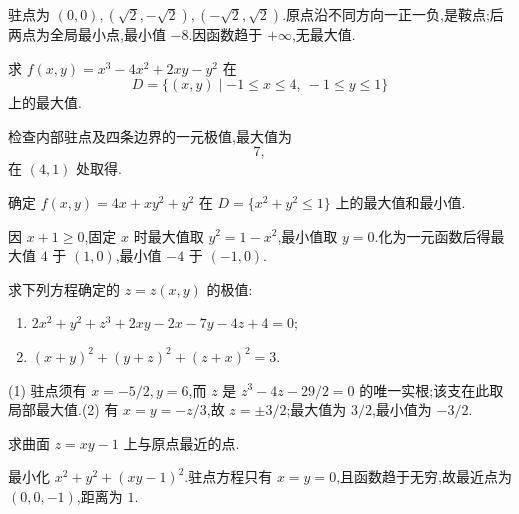 \begin{solution}
    驻点为 $(0,0),(\sqrt{2},-\sqrt{2}),(-\sqrt{2},\sqrt{2})$.原点沿不同方向一正一负,是鞍点;后两点为全局最小点,最小值 $-8$.因函数趋于 $+\infty$,无最大值.
\end{solution}

\begin{example}
    求 $f(x,y)=x^3-4x^2+2xy-y^2$ 在
    \[
        D=\{(x,y)\mid -1\leq x\leq4,\ -1\leq y\leq1\}
    \]
    上的最大值.
\end{example}
\exampleblank

\begin{solution}
    检查内部驻点及四条边界的一元极值,最大值为
    \[
        7,
    \]
    在 $(4,1)$ 处取得.
\end{solution}

\begin{example}
    确定 $f(x,y)=4x+xy^2+y^2$ 在 $D=\{x^2+y^2\leq1\}$ 上的最大值和最小值.
\end{example}
\exampleblank

\begin{solution}
    因 $x+1\geq0$,固定 $x$ 时最大值取 $y^2=1-x^2$,最小值取 $y=0$.化为一元函数后得最大值 $4$ 于 $(1,0)$,最小值 $-4$ 于 $(-1,0)$.
\end{solution}

\begin{example}
    求下列方程确定的 $z=z(x,y)$ 的极值:
    \begin{enumerate}
        \item $2x^2+y^2+z^3+2xy-2x-7y-4z+4=0$;
        \item $(x+y)^2+(y+z)^2+(z+x)^2=3$.
    \end{enumerate}
\end{example}
\exampleblank

\begin{solution}

    (1) 驻点须有 $x=-5/2,y=6$,而 $z$ 是 $z^3-4z-29/2=0$ 的唯一实根;该支在此取局部最大值.(2) 有 $x=y=-z/3$,故 $z=\pm3/2$;最大值为 $3/2$,最小值为 $-3/2$.
\end{solution}

\begin{example}
    求曲面 $z=xy-1$ 上与原点最近的点.
\end{example}
\exampleblank

\begin{solution}
    最小化 $x^2+y^2+(xy-1)^2$.驻点方程只有 $x=y=0$,且函数趋于无穷,故最近点为 $(0,0,-1)$,距离为 $1$.
\end{solution}

